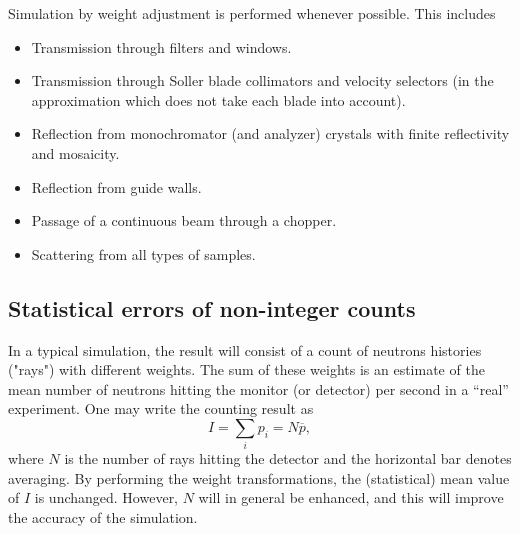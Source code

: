 Simulation by weight adjustment is performed
whenever possible. This includes
\begin{itemize}
\item Transmission through filters and windows.
\item Transmission through Soller blade collimators and velocity
  selectors
 (in the approximation
 which does not take each blade into account).
\item Reflection from monochromator (and analyzer) crystals
 with finite reflectivity and mosaicity.
\item Reflection from guide walls.
\item Passage of a continuous beam through a chopper.
\item Scattering from all types of samples.
\end{itemize}

\subsection{Statistical errors of non-integer counts}
\label{s:staterror}

In a typical simulation, the result will consist of a
count of neutrons histories ("rays") with different weights. The
sum of these weights is an estimate of the mean number of neutrons
hitting the monitor (or detector) per second in a ``real'' experiment.
One may write the counting result as
\begin{equation}
\label{psum}
I = \sum_i p_i = N \overline{p} ,
\end{equation}
where $N$ is the number of rays hitting the detector and the horizontal bar
denotes averaging.
By performing the weight transformations, the (statistical)
mean value of $I$ is unchanged. However, $N$ will in general be enhanced,
and this will improve the accuracy of the simulation.

